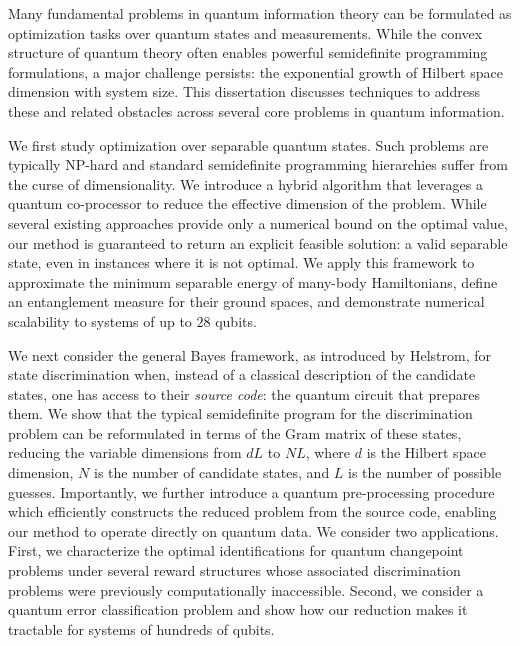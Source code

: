 
Many fundamental problems in quantum information theory can be formulated as optimization tasks over quantum states and measurements. 
While the convex structure of quantum theory often enables powerful semidefinite programming formulations, a major challenge persists: the exponential growth of Hilbert space dimension with system size. 
This dissertation discusses techniques to address these and related obstacles across several core problems in quantum information.


We first study optimization over separable quantum states. 
Such problems are typically NP-hard and standard semidefinite programming hierarchies suffer from the curse of dimensionality. 
We introduce a hybrid algorithm that leverages a quantum co-processor to reduce the effective dimension of the problem. 
While several existing approaches provide only a numerical bound on the optimal value, our method is guaranteed to return an explicit feasible solution: a valid separable state, even in instances where it is not optimal.
We apply this framework to approximate the minimum separable energy of many-body Hamiltonians, define an entanglement measure for their ground spaces, and demonstrate numerical scalability to systems of up to $28$ qubits.


We next consider the general Bayes framework, as introduced by Helstrom, for state discrimination when, instead of a classical description of the candidate states, one has access to their \emph{source code}: the quantum circuit that prepares them.
We show that the typical semidefinite program for the discrimination problem can be reformulated in terms of the Gram matrix of these states, reducing the variable dimensions from $dL$ to $NL$, where $d$ is the Hilbert space dimension, $N$ is the number of candidate states, and $L$ is the number of possible guesses.
Importantly, we further introduce a quantum pre-processing procedure which efficiently constructs the reduced problem from the source code, enabling our method to operate directly on quantum data. 
We consider two applications.
First, we characterize the optimal identifications for quantum changepoint problems under several reward structures 
whose associated discrimination problems were previously computationally inaccessible.
Second, we consider a quantum error classification problem and show how our reduction makes it tractable for systems of hundreds of qubits.


